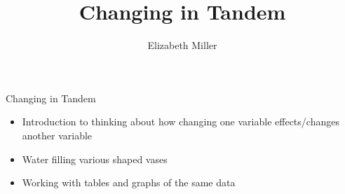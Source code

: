 \documentclass{ximera}
\author{Elizabeth Miller}
\title{Changing in Tandem}
\begin{document}
\begin{abstract}
\end{abstract}
\maketitle


\begin{objectives}

\item Changing in Tandem
\begin{itemize}
	\item Introduction to thinking about how changing one variable effects/changes another variable 
	\item Water filling various shaped vases 
	\item Working with tables and graphs of the same data
\end{itemize}

\end{objectives}
\end{document}
